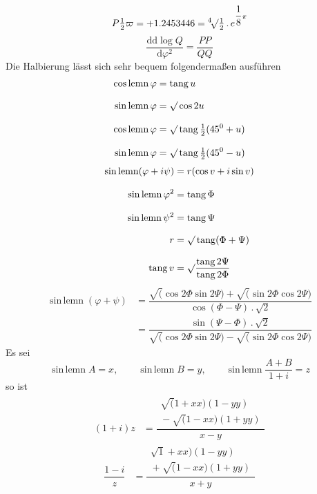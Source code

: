 \[
P\tfrac12\varpi=+1.2453446
={}^{4}\!\surd\tfrac12\, .\,e^{\dfrac18\pi}
\]
\[
\dfrac{\mathrm d\mathrm d\log Q}{\mathrm d\varphi^2}=\dfrac{PP}{QQ}
\]
Die Halbierung lässt sich sehr bequem folgendermaßen ausführen
\[
\begin{aligned}
\operatorname{cos\,lemn}\varphi&=\operatorname{tang}u\\[8pt]
\operatorname{sin\,lemn}\varphi&=\surd\cos2u\\[8pt]
\operatorname{cos\,lemn}\varphi&=\surd\operatorname{tang}\tfrac12(45^0+u)\\[8pt]
\operatorname{sin\,lemn}\varphi&=\surd\operatorname{tang}\tfrac12(45^0-u)
\end{aligned}
\]
\[
\begin{aligned}
\operatorname{sin\,lemn}(\varphi+i\psi)&=r(\cos v+i\sin v)\\[8pt]
\operatorname{sin\,lemn}\varphi^2&=\operatorname{tang}\Phi\\[8pt]
\operatorname{sin\,lemn}\psi^2&=\operatorname{tang}\Psi\\[8pt]
r&=\surd\operatorname{tang}(\Phi+\Psi)\\[8pt]
\operatorname{tang}v&=\surd\dfrac{\operatorname{tang}2\Psi}{\operatorname{tang}2\Phi}
\end{aligned}
\]
\[
\begin{aligned}
\operatorname{sin\,lemn}(\varphi+\psi)
&=\dfrac{\surd(\cos2\Phi\sin2\Psi)+\surd(\sin2\Phi\cos2\Psi)}{\cos(\Phi-\Psi)\, .\,\surd2}\\[8pt]
&=\dfrac{\sin(\Psi-\Phi)\, .\,\surd2}{\surd(\cos2\Phi\sin2\Psi)-\surd(\sin2\Phi\cos2\Psi)}
\end{aligned}
\]
Es sei
\[
\operatorname{sin\,lemn}A=x,\qquad
\operatorname{sin\,lemn}B=y,\qquad
\operatorname{sin\,lemn}\dfrac{A+B}{1+i}=z
\]
so ist
\[
\begin{aligned}(1+i)z&=\dfrac{\begin{gathered}\surd(1+xx)(1-yy)\\[3pt]{}-\surd(1-xx)(1+yy)\end{gathered}}{x-y}\end{aligned}
\]
\[
\begin{aligned}\dfrac{1-i}{z}&=\dfrac{\begin{gathered}\surd1+xx)(1-yy)\\[3pt]{}+\surd(1-xx)(1+yy)\end{gathered}}{x+y}\end{aligned}
\]
